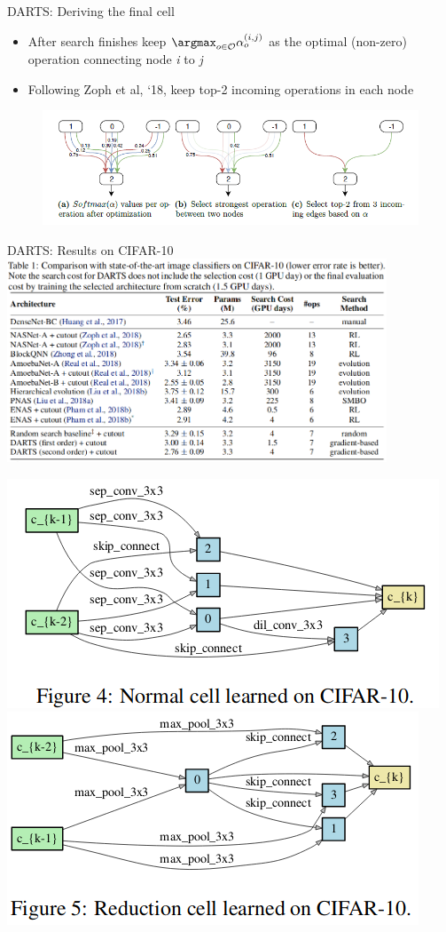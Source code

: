 \begin{frame}{DARTS: Deriving the final cell}
    \begin{itemize}
        \item After search finishes keep $\argmax_{o\in\mathcal{O}}\alpha_{o}^{(i,j)}$ as the optimal (non-zero) operation connecting node \textit{i} to \textit{j}
        \item Following Zoph et al, ‘18, keep top-2 incoming operations in each node
    \end{itemize}

    \begin{figure}[t]
        \begin{centering}
            \includegraphics[scale=0.55]{images_lec7/genotype.png}
        \end{centering}
    \end{figure}

\end{frame}

\begin{frame}{DARTS: Results on CIFAR-10}
\centering
\includegraphics[width=0.85\textwidth]{images_lec7/darts_cnn_results.png}

\includegraphics[width=.35\textwidth]{images_lec7/darts_normal_cell.png}
\includegraphics[width=.35\textwidth]{images_lec7/darts_reduction_cell.png}

\end{frame}


